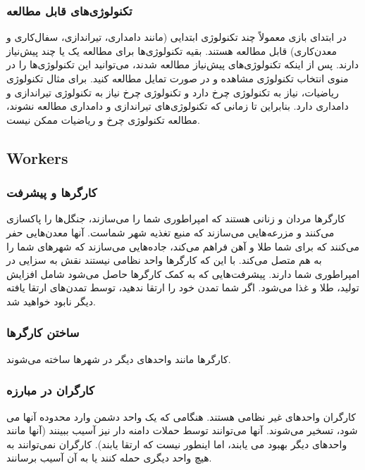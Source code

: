 \documentclass[]{article}
\begin{document}
\subsubsection*{{\titr تکنولوژی‌های قابل مطالعه}}
در ابتدای بازی معمولاً چند تکنولوژی ابتدایی (مانند دامداری، تیراندازی، سفال‌کاری و معدن‌کاری) قابل مطالعه هستند. بقیه تکنولوژی‌ها برای مطالعه یک یا چند پیش‌نیاز دارند. پس از اینکه تکنولوژی‌های پیش‌نیاز مطالعه شدند، می‌توانید این تکنولوژی‌ها را در منوی انتخاب تکنولوژی مشاهده و در صورت تمایل مطالعه کنید. برای مثال تکنولوژی ریاضیات، نیاز به تکنولوژی چرخ دارد و تکنولوژی چرخ نیاز به تکنولوژی تیراندازی و دامداری دارد. بنابراین تا زمانی که تکنولوژی‌های تیراندازی و دامداری مطالعه نشوند، مطالعه تکنولوژی چرخ و ریاضیات ممکن نیست.



\subsection*{{\titr Workers}}


\subsubsection*{{\titr کارگرها و پیشرفت}}
کارگرها مردان و زنانی هستند که امپراطوری شما را می‌سازند، جنگل‌ها را پاکسازی می‌کنند و مزرعه‌هایی می‌سازند که منبع تغذیه شهر شماست.
آنها معدن‌هایی حفر می‌کنند که برای شما طلا و آهن فراهم می‌کند، جاده‌‌هایی می‌سازند که شهرهای شما را به هم متصل می‌کند.
با این که کارگرها واحد نظامی نیستند نقش به سزایی در امپراطوری شما دارند.
پیشرفت‌هایی که به کمک کارگرها حاصل می‌شود شامل افزایش تولید، طلا و غذا می‌شود. اگر شما تمدن خود را ارتقا ندهید، توسط تمدن‌های ارتقا یافته دیگر نابود خواهید شد.

\subsubsection*{{\titr ساختن کارگرها}}
کارگرها مانند واحدهای دیگر در شهرها ساخته می‌شوند.

\subsubsection*{{\titr کارگران در مبارزه}}
کارگران واحدهای غیر نظامی هستند. هنگامی که یک واحد دشمن وارد محدوده آنها می شود، تسخیر می‌شوند.
آنها می‌توانند توسط حملات دامنه دار نیز آسیب ببینند (آنها مانند واحدهای دیگر بهبود می یابند، اما اینطور نیست که ارتقا یابند). کارگران نمی‌توانند به هیچ واحد دیگری حمله کنند یا به آن آسیب برسانند. 
\end{document}
